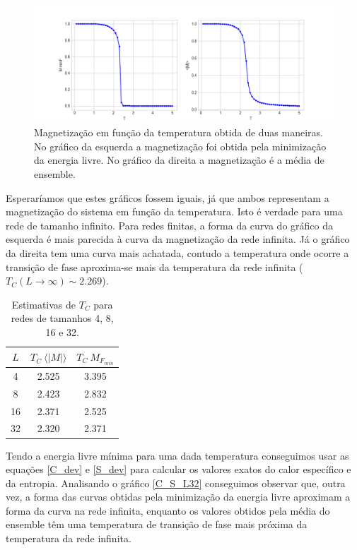 \documentclass[12pt, a4paper]{article}
\begin{document}
	\begin{figure}[h]
		\centering
		\includegraphics[scale=0.45]{M_L32.png}
		\caption{Magnetização em função da temperatura obtida de duas maneiras. No gráfico da esquerda a magnetização foi obtida pela minimização da energia livre. No gráfico da direita a magnetização é a média de ensemble.}
		\label{M_L32}
	\end{figure}
	Esperaríamos que estes gráficos fossem iguais, já que ambos representam a magnetização do sistema em função da temperatura. Isto é verdade para uma rede de tamanho infinito. Para redes finitas, a forma da curva do gráfico da esquerda é mais parecida à curva da magnetização da rede infinita. Já o gráfico da direita tem uma curva mais achatada, contudo a temperatura onde ocorre a transição de fase aproxima-se mais da temperatura da rede infinita ($T_C(L \rightarrow \infty) \sim 2.269$).
\begin{table}[h]
\centering
\caption{Estimativas de $T_C$ para redes de tamanhos 4, 8, 16 e 32.}
\begin{tabular}{c|c|c}
$L$  & $T_C\ \langle |M| \rangle$ & $T_C\ M_{F_{min}}$ \\ \hline
4  & 2.525                               & 3.395                    \\
8  & 2.423                               & 2.832                    \\
16 & 2.371                               & 2.525                   \\
32 & 2.320                               & 2.371                 
\end{tabular}
\end{table}	

	Tendo a energia livre mínima para uma dada temperatura conseguimos usar as equações \ref{C_dev} e \ref{S_dev} para calcular os valores exatos do calor específico e da entropia. Analisando o gráfico \ref{C_S_L32} conseguimos observar que, outra vez, a forma das curvas obtidas pela minimização da energia livre aproximam a forma da curva na rede infinita, enquanto os valores obtidos pela média do ensemble têm uma temperatura de transição de fase mais próxima da temperatura da rede infinita.
	
\end{document}
